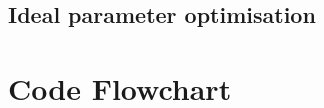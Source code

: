 \documentclass[a4paper]{article}
\begin{document}
\subsection{Ideal parameter optimisation}

\clearpage


\section{Code Flowchart}


\clearpage

\end{document}
